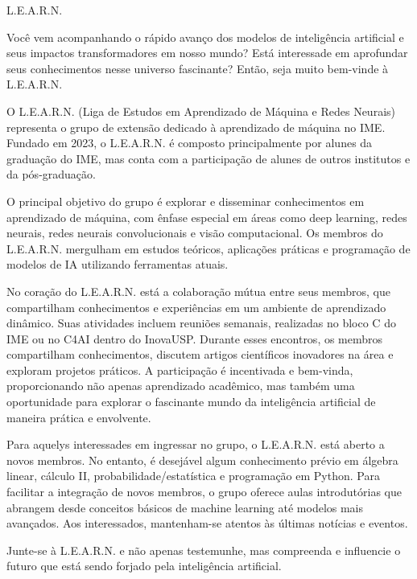 \begin{subsecao}{L.E.A.R.N.}


Você vem acompanhando o rápido avanço dos modelos de inteligência artificial e seus 
impactos transformadores em nosso mundo? Está interessade em aprofundar seus 
conhecimentos nesse universo fascinante? Então, seja muito bem-vinde à L.E.A.R.N.

O L.E.A.R.N. (Liga de Estudos em Aprendizado de Máquina e Redes Neurais) representa 
o grupo de extensão dedicado à aprendizado de máquina no IME. Fundado em 2023, o 
L.E.A.R.N. é composto principalmente por alunes da graduação do IME, mas conta com 
a participação de alunes de outros institutos e da pós-graduação.

O principal objetivo do grupo é explorar e disseminar conhecimentos em aprendizado 
de máquina, com ênfase especial em áreas como deep learning, redes neurais, redes 
neurais convolucionais e visão computacional. Os membros do L.E.A.R.N. mergulham em 
estudos teóricos, aplicações práticas e programação de modelos de IA utilizando 
ferramentas atuais.

No coração do L.E.A.R.N. está a colaboração mútua entre seus membros, que 
compartilham conhecimentos e experiências em um ambiente de aprendizado dinâmico. 
Suas atividades incluem reuniões semanais, realizadas no bloco C do IME ou no C4AI 
dentro do InovaUSP. Durante esses encontros, os membros compartilham conhecimentos, 
discutem artigos científicos inovadores na área e exploram projetos práticos. A 
participação é incentivada e bem-vinda, proporcionando não apenas aprendizado 
acadêmico, mas também uma oportunidade para explorar o fascinante mundo da 
inteligência artificial de maneira prática e envolvente. 

Para aquelys interessades em ingressar no grupo, o L.E.A.R.N. está aberto a novos 
membros. No entanto, é desejável algum conhecimento prévio em álgebra linear, 
cálculo II, probabilidade/estatística e programação em Python. Para facilitar a 
integração de novos membros, o grupo oferece aulas introdutórias que abrangem desde 
conceitos básicos de machine learning até modelos mais avançados. Aos interessados, 
mantenham-se atentos às últimas notícias e eventos.

Junte-se à L.E.A.R.N. e não apenas testemunhe, mas compreenda e influencie o futuro 
que está sendo forjado pela inteligência artificial.

\end{subsecao}
